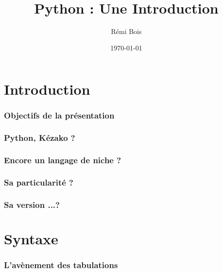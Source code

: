 \documentclass{beamer}
\title{Python : Une Introduction}
\institute{ASCII}
\author{Rémi Bois}
\date{\today}
\begin{document}
\begin{frame}
  \maketitle
\end{frame}

\section{Introduction}
\label{sec:intro}


\begin{frame}
  \frametitle{Objectifs de la présentation}
\end{frame}

\begin{frame}
  \frametitle{Python, Kézako ?}
\end{frame}

\begin{frame}
  \frametitle{Encore un langage de niche ?}
\end{frame}

\begin{frame}
  \frametitle{Sa particularité ?}
\end{frame}

\begin{frame}
  \frametitle{Sa version ...?}
\end{frame}

\section{Syntaxe}
\label{sec:syntax}

\begin{frame}
  \frametitle{L'avènement des tabulations}
\end{frame}
\end{document}
